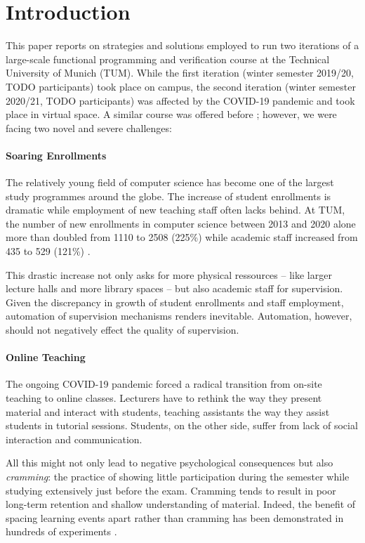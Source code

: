 \section{Introduction}

This paper reports on strategies and solutions employed to
run two iterations of a large-scale functional programming and verification course at the Technical University of Munich (TUM).
While the first iteration (winter semester 2019/20, TODO participants)
took place on campus,
the second iteration (winter semester 2020/21, TODO participants) was affected by the COVID-19 pandemic and took place in virtual space.
A similar course was offered before \citep{next_1100};
however, we were facing two novel and severe challenges:

\paragraph{Soaring Enrollments}
The relatively young field of computer science has
become one of the largest study programmes around the globe.
The increase of student enrollments is dramatic
\citep{comp_sci_growth1,comp_sci_growth2}
while employment of new teaching staff often lacks behind.
At TUM, the number of new enrollments in computer science between 2013 and 2020 alone
more than doubled from 1110 to 2508 (225\%)
while academic staff increased from 435 to 529 (121\%) \citep{tum_numbers}.

This drastic increase not only asks for more physical ressources -- like larger lecture halls and more library spaces --
but also academic staff for supervision.
Given the discrepancy in growth of student enrollments and staff employment,
automation of supervision mechanisms renders inevitable.
Automation, however, should not
negatively effect the quality of supervision.

\paragraph{Online Teaching}
The ongoing COVID-19 pandemic forced a radical
transition from on-site teaching to online classes.
Lecturers have to rethink the way they present material and interact with students,
teaching assistants the way they assist students in tutorial sessions.
Students, on the other side, suffer from lack of social interaction and communication.

All this might not only lead to negative psychological consequences but also \emph{cramming}:
the practice of showing little participation during the semester
while studying extensively just before the exam.
Cramming tends to result in poor long-term retention and shallow understanding of material.
Indeed, the benefit of spacing learning events apart rather than cramming has been demonstrated in hundreds of experiments \citep{cramming1,cramming2}.

